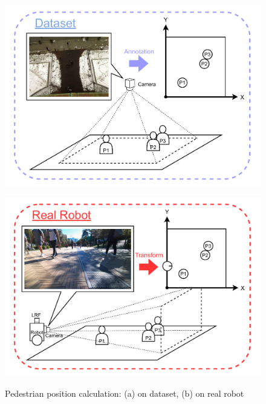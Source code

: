\begin{figure}[H]
  \centering
  \begin{minipage}{0.85\textwidth}
    \centering
    \includegraphics[width=\linewidth]{images/ped2pos-dataset.pdf}
    \label{Fig:ped2pos-dataset}
  \end{minipage}
  \hfill
  \begin{minipage}{0.85\textwidth}
    \centering
    \includegraphics[width=\linewidth]{images/ped2pos-realrobot.pdf}
    \label{Fig:ped2pos-realrobot}
  \end{minipage}
  \caption{Pedestrian position calculation: (a) on dataset, (b) on real robot}
  \label{Fig:ped2pos}
\end{figure}

